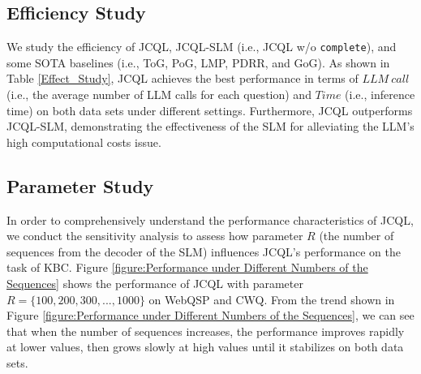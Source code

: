 \documentclass[11pt]{article}
\begin{document}
\subsection{Efficiency Study}
We study the efficiency of JCQL, JCQL-SLM (i.e., JCQL w/o  \texttt{complete}), and some SOTA baselines (i.e., ToG, PoG, LMP, PDRR, and GoG).
As shown in Table \ref{Effect_Study}, JCQL achieves the best performance in terms of $LLM\  call$ (i.e., the average number of LLM calls for each question) and $Time$ (i.e., inference time) on both data sets under different settings. 
Furthermore, JCQL outperforms JCQL-SLM, demonstrating the effectiveness of the SLM for alleviating the LLM's high computational costs issue.

\subsection{Parameter Study}
In order to comprehensively understand the performance characteristics of JCQL, we conduct the sensitivity analysis to assess how parameter $R$ (the number of sequences from the decoder of the SLM) influences JCQL's performance on the task of KBC. Figure \ref{figure:Performance under Different Numbers of the Sequences} shows the performance of JCQL with parameter $R=\{100,200,300,..., 1000\}$ on WebQSP and CWQ. From the trend shown in Figure \ref{figure:Performance under Different Numbers of the Sequences}, we can see that when the number of sequences increases, the performance improves rapidly at lower values, then grows slowly at high values until it stabilizes on both data sets. 






\end{document}
